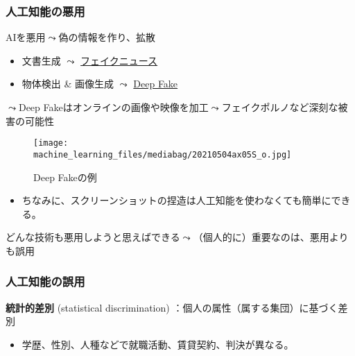 \documentclass[
  xelatex,
  ja=standard]{bxjsarticle}
\providecommand{\tightlist}{%
  \setlength{\itemsep}{0pt}\setlength{\parskip}{0pt}}\usepackage{longtable,booktabs,array}
\begin{document}
\hypertarget{ux4ebaux5de5ux77e5ux80fdux306eux60aaux7528}{%
\subsubsection{人工知能の悪用}\label{ux4ebaux5de5ux77e5ux80fdux306eux60aaux7528}}

AIを悪用\(\leadsto\)偽の情報を作り、拡散

\begin{itemize}
\tightlist
\item
  文書生成 \(\leadsto\)
  \href{https://www.itmedia.co.jp/business/articles/2007/29/news025_4.html}{フェイクニュース}
\item
  物体検出 \& 画像生成 \(\leadsto\)
  \href{https://wired.jp/2018/09/14/deepfake-fake-videos-ai/}{Deep Fake}
\end{itemize}

\(\leadsto\)Deep
Fakeはオンラインの画像や映像を加工\(\leadsto\)フェイクポルノなど深刻な被害の可能性

\begin{figure}[htpb]

{\centering \texttt{[image: machine\_learning\_files/mediabag/20210504ax05S\_o.jpg]}

}

\caption{Deep Fakeの例}

\end{figure}

\begin{itemize}
\tightlist
\item
  ちなみに、スクリーンショットの捏造は人工知能を使わなくても簡単にできる。
\end{itemize}

どんな技術も悪用しようと思えばできる\(\leadsto\)（個人的に）重要なのは、悪用よりも誤用

\hypertarget{ux4ebaux5de5ux77e5ux80fdux306eux8aa4ux7528}{%
\subsubsection{人工知能の誤用}\label{ux4ebaux5de5ux77e5ux80fdux306eux8aa4ux7528}}

\textbf{統計的差別} (statistical discrimination)
：個人の属性（属する集団）に基づく差別

\begin{itemize}
\tightlist
\item
  学歴、性別、人種などで就職活動、賃貸契約、判決が異なる。
\end{itemize}
\end{document}
